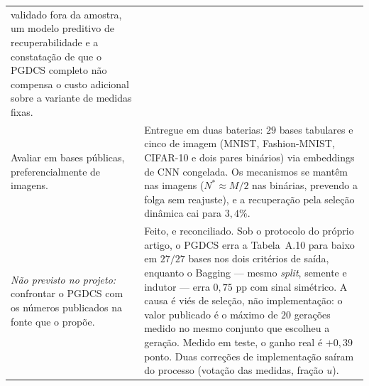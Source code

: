 \begin{longtable}{@{}>{\raggedright\arraybackslash}p{} >{\raggedright\arraybackslash}p{}@{}}
validado fora da amostra, um modelo preditivo de recuperabilidade e a constatação de
que o PGDCS completo não compensa o custo adicional sobre a variante de medidas
fixas. \\
\addlinespace
Avaliar em bases públicas, preferencialmente de imagens.
& Entregue em duas baterias: $29$ bases tabulares e cinco de imagem (MNIST,
Fashion-MNIST, CIFAR-10 e dois pares binários) via embeddings de CNN congelada.
Os mecanismos se mantêm nas imagens ($N^{*}\approx M/2$ nas binárias, \dfe{}
prevendo a folga sem reajuste), e a recuperação pela seleção dinâmica cai para
$3{,}4\%$. \\
\addlinespace
\emph{Não previsto no projeto:} confrontar o PGDCS com os números publicados na
fonte que o propõe.
& Feito, e reconciliado. Sob o protocolo do próprio artigo, o PGDCS erra a
Tabela~A.10 para baixo em $27/27$ bases nos dois critérios de saída, enquanto o
Bagging --- mesmo \emph{split}, semente e indutor --- erra $0{,}75$ pp com sinal
simétrico. A causa é viés de seleção, não implementação: o valor publicado é o
máximo de $20$ gerações medido no mesmo conjunto que escolheu a geração. Medido em
teste, o ganho real é $+0{,}39$ ponto. Duas correções de implementação saíram do
processo (votação das medidas, fração $u$). \\
\bottomrule
\end{longtable}

